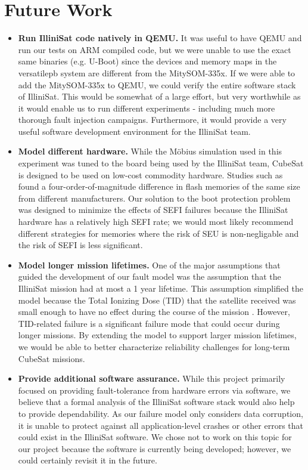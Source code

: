 \section{Future Work}\label{sec:future_work}
\begin{itemize}
  \item {\bf Run IlliniSat code natively in QEMU.} It was useful to have QEMU
  and run our tests on ARM compiled code, but we were unable to use the exact
  same binaries (e.g. U-Boot) since the devices and memory maps in the
  versatilepb system are different from the MitySOM-335x.  If we were able to
  add the MitySOM-335x to QEMU, we could verify the entire software stack of
  IlliniSat.  This would be somewhat of a large effort, but very worthwhile as
  it would enable us to run different experiments - including much more thorough
  fault injection campaigns.  Furthermore, it would provide a very useful
  software development environment for the IlliniSat team.
  \item {\bf Model different hardware.}  While the M\"obius simulation used in this experiment was tuned to the board being used by the IlliniSat team, CubeSat is designed to be used on low-cost commodity hardware.  Studies such as \cite{Oldham2008TID} found a four-order-of-magnitude difference in flash memories of the same size from different manufacturers.  Our solution to the boot protection problem was designed to minimize the effects of SEFI failures because the IlliniSat hardware has a relatively high SEFI rate; we would most likely recommend different strategies for memories where the risk of SEU is non-negligable and the risk of SEFI is less significant.
  \item {\bf Model longer mission lifetimes.}  One of the major assumptions that guided the development of our fault model was the assumption that the IlliniSat mission had at most a 1 year lifetime.  This assumption simplified the model because the Total Ionizing Dose (TID) that the satellite received was small enough to have no effect during the course of the mission \cite{Likar2010Novel, Oldham2008TID}.  However, TID-related failure is a significant failure mode that could occur during longer missions.  By extending the model to support larger mission lifetimes, we would be able to better characterize reliability challenges for long-term CubeSat missions.
  \item {\bf Provide additional software assurance.} While this project
  primarily focused on providing fault-tolerance from hardware errors via
  software, we believe that a formal analysis of the IlliniSat software stack
  would also help to provide dependability.  As our failure model only considers
  data corruption, it is unable to protect against all application-level crashes
  or other errors that could exist in the IlliniSat software.  We chose not to
  work on this topic for our project because the software is currently being
  developed; however, we could certainly revisit it in the future.
\end{itemize}
